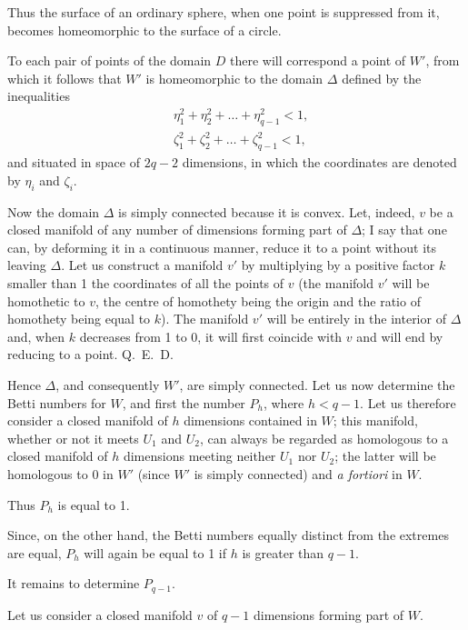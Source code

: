 \documentclass{article}
\begin{document}
Thus the surface of an ordinary sphere, when one point is suppressed from it, becomes homeomorphic to the surface of a circle.

To each pair of points of the domain $D$ there will correspond a point of $W'$, from which it follows that $W'$ is homeomorphic to the domain $\Delta$ defined by the inequalities
\[ \begin{aligned} &\eta^{2}_{1} + \eta^{2}_{2} + \ldots + \eta^{2}_{q-1} < 1,\\ &\zeta^{2}_{1} + \zeta^{2}_{2} + \ldots + \zeta^{2}_{q-1} < 1, \end{aligned} \]
and situated in space of $2q - 2$ dimensions, in which the coordinates are denoted by $\eta_{i}$ and $\zeta_{i}$.

Now the domain $\Delta$ is simply connected because it is convex. Let, indeed, $v$ be a closed manifold of any number of dimensions forming part of $\Delta$; I say that one can, by deforming it in a continuous manner,
reduce it to a point without its leaving $\Delta$. Let us construct a manifold $v'$ by multiplying by a positive factor $k$ smaller than 1 the coordinates of all the points of $v$ (the manifold $v'$ will be homothetic to $v$, the centre of homothety being the origin and the ratio of homothety being equal to $k$). The manifold $v'$ will be entirely in the interior of $\Delta$ and, when $k$ decreases from 1 to 0, it will first coincide with $v$ and will end by reducing to a point. Q.~E.~D.

Hence $\Delta$, and consequently $W'$, are simply connected. Let us now determine the Betti numbers for $W$, and first the number $P_{h}$, where $h < q - 1$. Let us therefore consider a closed manifold of $h$ dimensions contained in $W$; this manifold, whether or not it meets $U_{1}$ and $U_{2}$, can always be regarded as homologous to a closed manifold of $h$ dimensions meeting neither $U_{1}$ nor $U_{2}$; the latter will be homologous to 0 in $W'$ (since $W'$ is simply connected) and \emph{a fortiori} in $W$.

Thus $P_{h}$ is equal to 1.

Since, on the other hand, the Betti numbers equally distinct from the extremes are equal, $P_{h}$ will again be equal to 1 if $h$ is greater than $q - 1$.

It remains to determine $P_{q-1}$.

Let us consider a closed manifold $v$ of $q - 1$ dimensions forming part of $W$.
\end{document}
